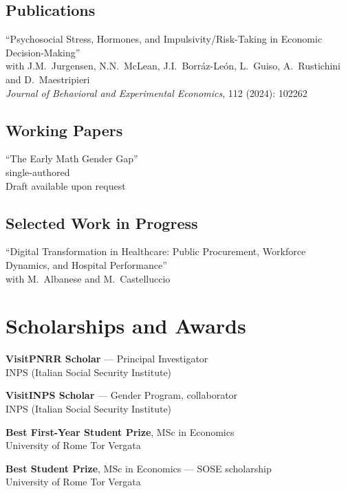 \documentclass[11pt,a4paper]{article}
\let\originalhref\href
\renewcommand{\href}[2]{\originalhref{#1}{\underline{\smash{#2}}}}
\newenvironment{cvlist}[1][3.0cm]{%
  \begin{list}{}{%
    \setlength{\leftmargin}{#1}%
    \setlength{\labelwidth}{\dimexpr#1-0.4cm\relax}%
    \setlength{\labelsep}{0.4cm}%
    \setlength{\itemsep}{5pt}%
    \setlength{\parsep}{0pt}%
    \setlength{\topsep}{3pt}%
    \renewcommand{\makelabel}[1]{##1\hfil}}}
  {\end{list}}
\newcommand{\when}[1]{\item[#1]}
\newcommand{\meta}[1]{{\small\hspace*{1.4em}#1}}
\begin{document}
\subsection*{Publications}
\noindent
``Psychosocial Stress, Hormones, and Impulsivity/Risk-Taking in Economic
Decision-Making'' \href{https://www.sciencedirect.com/science/article/abs/pii/S2214804324000995}{[Paper]}\\
\meta{with J.M.\ Jurgensen, N.N.\ McLean, J.I.\ Borr\'az-Le\'on, L.\ Guiso,
A.\ Rustichini and D.\ Maestripieri}\\
\meta{\textit{Journal of Behavioral and Experimental Economics}, 112 (2024): 102262}

\subsection*{Working Papers}
\noindent
``The Early Math Gender Gap''\\
\meta{single-authored}\\
\meta{Draft available upon request}

\subsection*{Selected Work in Progress}
\noindent
``Digital Transformation in Healthcare: Public Procurement, Workforce Dynamics,
and Hospital Performance'' \\
\meta{with M.\ Albanese and M.\ Castelluccio}

\section{Scholarships and Awards}
\begin{cvlist}
  \when{2025}
    \textbf{VisitPNRR Scholar} --- Principal Investigator\\
    INPS (Italian Social Security Institute)

  \when{2023 -- 2025}
    \textbf{VisitINPS Scholar} --- Gender Program, collaborator\\
    INPS (Italian Social Security Institute)

  \when{2022}
    \textbf{Best First-Year Student Prize}, MSc in Economics\\
    University of Rome Tor Vergata

  \when{2021}
    \textbf{Best Student Prize}, MSc in Economics --- SOSE scholarship\\
    University of Rome Tor Vergata
\end{cvlist}
\end{document}
